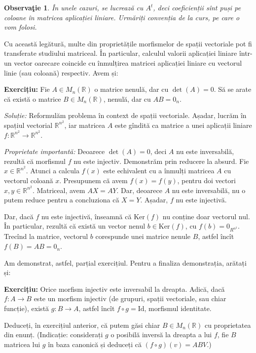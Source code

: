 \documentclass[11pt,a4paper]{article}
\newcommand\RR{\mathbb{R}}
\theoremstyle{dotless}
\theoremstyle{dotlessdr}
\newtheorem{remark}{Observa\c{t}ie}[section]
\begin{document}
\begin{remark}\label{rk:sau-trans}
  În unele cazuri, se lucrează cu $A^t$, deci coeficienții sînt puși \emph{pe coloane}
  în matricea aplicației liniare. Urmăriți convenția de la curs, pe care o vom folosi.
\end{remark}

Cu această legătură, multe din proprietățile morfismelor de spații vectoriale pot fi
transferate studiului matriceal. În particular, calculul valorii aplicației liniare
într-un vector oarecare coincide cu înmulțirea matricei aplicației liniare cu vectorul
linie (sau coloană) respectiv. Avem și:

\textbf{Exercițiu:} Fie $A \in M_n(\RR)$ o matrice nenulă, dar cu $\det(A) = 0$.
Să se arate că există o matrice $B \in M_n(\RR)$, nenulă, dar cu $AB = 0_n$.

\emph{Soluție:} Reformulăm problema în context de spații vectoriale. Așadar,
lucrăm în spațiul vectorial $\RR^{n^2}$, iar matricea $A$ este gîndită ca matrice
a unei aplicații liniare $f : \RR^{n^2} \to \RR^{n^2}$.

\emph{Proprietate importantă:} Deoarece $\det(A) = 0$, deci $A$ nu este inversabilă,
rezultă că morfismul $f$ nu este injectiv. Demonstrăm prin reducere la absurd. Fie
$x \in \RR^{n^2}$. Atunci a calcula $f(x)$ este echivalent cu a înmulți matricea $A$
cu vectorul coloană $x$. Presupunem că avem $f(x) = f(y)$, pentru doi vectori
$x, y \in \RR^{n^2}$. Matriceal, avem $AX = AY$. Dar, deoarece $A$ nu este inversabilă,
nu o putem reduce pentru a concluziona că $X = Y$. Așadar, $f$ nu este injectivă.

Dar, dacă $f$ nu este injectivă, înseamnă că $\mathrm{Ker}(f)$ nu conține doar
vectorul nul. În particular, rezultă că există un vector nenul $b \in \mathrm{Ker}(f)$,
cu $f(b) = 0_{R^{n^2}}$. Trecînd la matrice, vectorul $b$ corespunde unei matrice nenule $B$,
astfel încît $f(B) = AB = 0_n$.

\vspace{1cm}

Am demonstrat, astfel, parțial exercițiul. Pentru a finaliza demonstrația, arătați și:

\textbf{Exercițiu:} Orice morfism injectiv este inversabil la dreapta. Adică,
dacă $f : A \to B$ este un morfism injectiv (de grupuri, spații vectoriale, sau chiar funcție),
există $g : B \to A$, astfel încît $f \circ g = \mathrm{Id}$, morfismul identitate.

Deduceți, în exercițiul anterior, că putem găsi chiar $B \in M_n(\RR)$ cu proprietatea
din enunț. (Indicație: considerați $g$ o posibilă inversă la dreapta a lui $f$, fie $B$
matricea lui $g$ în baza canonică și deduceți că $(f \circ g)(v) = ABV$.)
\end{document}
